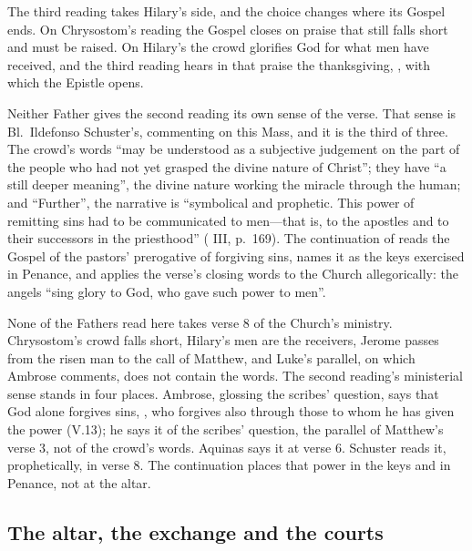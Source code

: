 The third reading takes Hilary's side, and the choice changes where its Gospel
ends. On Chrysostom's reading the Gospel closes on praise that still falls short
and must be raised. On Hilary's the crowd glorifies God for what men have
received, and the third reading hears in that praise the thanksgiving,
, with which the Epistle opens.

Neither Father gives the second reading its own sense of the verse. That
sense is Bl.\ Ildefonso
Schuster's, commenting on this Mass, and it is the third of three. The crowd's
words ``may be understood as a subjective judgement on the part of the people
who had not yet grasped the divine nature of Christ''; they have ``a still deeper
meaning'', the divine nature working the miracle through the human; and
``Further'', the narrative is ``symbolical and prophetic. This power of
remitting sins had to be communicated to men---that is, to the apostles and to
their successors in the priesthood'' ( III, p.~169). The
continuation of  reads the Gospel of the pastors'
prerogative of forgiving sins, names it as the keys exercised in Penance, and
applies the verse's closing words to the Church allegorically: the angels
``sing glory to God, who gave such power to men''.

None of the Fathers read here takes verse 8 of the Church's ministry.
Chrysostom's crowd falls short, Hilary's men are the receivers, Jerome passes
from the risen man to the call of Matthew, and Luke's parallel, on which Ambrose
comments, does not contain the words. The second reading's ministerial sense
stands in four places. Ambrose, glossing the scribes'
question, says that God alone forgives sins, , who forgives also through
those to whom he has given the power (V.13); he says it of the scribes'
question, the parallel of Matthew's verse 3, not of the crowd's words. Aquinas
says it at verse 6. Schuster reads it, prophetically, in verse 8. The
continuation places that power in the keys and in Penance, not at the altar.

\subsection{The altar, the exchange and the courts}

